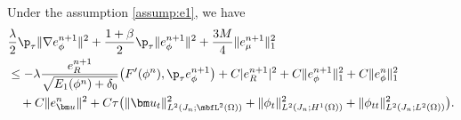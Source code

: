 \begin{lemma} \label{lem:err:CH}
	Under the assumption \eqref{assump:e1}, we have
	\begin{equation*}  
		\begin{aligned}
			&\frac{\lambda }{2}\p_\tau \|\nabla e_\phi^{n+1}\|^2+\frac{1+\beta}{2}\p_\tau \|e_\phi^{n+1}\|^2
			+\frac{3M}{4}\|e_\mu^{n+1}\|_1^2 \\
			& \leq  -\lambda  \frac{e_R^{n+1}}{\sqrt{E_1(\phi^{n})+\delta_0}} \big(F^{\prime}(\phi^{n}),\p_\tau  e_\phi^{n+1}\big)
			+C|e_R^{n+1}|^2 + C\|e_\phi^{n+1}\|_1^2 + C\|e_\phi^n\|_1^2			\\
			& \quad    +C\|e_{\bm u}^n\|^2+C \tau \big(\|\bm u_t\|_{L^2(J_n ; \mbfL^2(\Omega))}^2+\|\phi_t\|_{L^2(J_n ; H^1(\Omega))}^2+\|\phi_{tt}\|_{L^2(J_n ; L^2(\Omega))}^2\big).
		\end{aligned}
	\end{equation*}
\end{lemma}
